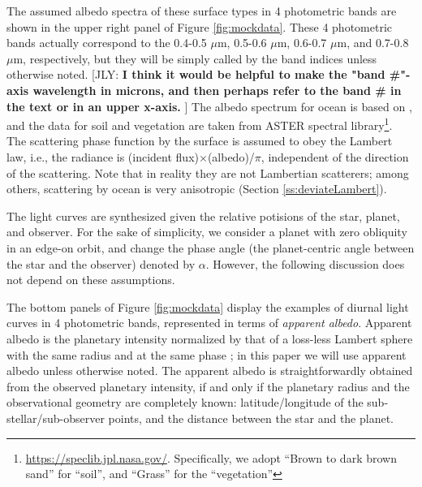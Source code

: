 \documentclass[iop,numberedappendix,apj,]{emulateapj}
\def\memoYF#1{\color{red}[YF: {\bf #1}]\color{black}}
\def\memoJLY#1{\color{green}[JLY: {\bf #1}]\color{black}}
\begin{document}
The assumed albedo spectra of these surface types in 4 photometric bands are shown in the upper right panel of Figure \ref{fig:mockdata}. 
These 4 photometric bands actually correspond to the 0.4-0.5 $\mu $m, 0.5-0.6 $\mu $m, 0.6-0.7 $\mu $m, and 0.7-0.8 $\mu $m, respectively, but they will be simply called by the band indices unless otherwise noted. \memoJLY{I think it would be helpful to make the "band \#"-axis wavelength in microns, and then perhaps refer to the band \# in the text or in an upper x-axis. }
The albedo spectrum for ocean is based on \citet{Mclinden1997}, 
and the data for soil and vegetation are taken from ASTER spectral library\footnote{\url{https://speclib.jpl.nasa.gov/}. 
Specifically, we adopt  ``Brown to dark brown sand'' for ``soil'', and ``Grass'' for the ``vegetation''}. 
The scattering phase function by the surface is assumed to obey the Lambert law, i.e., the radiance is (incident flux)$\times $(albedo)/$\pi$, independent of the direction of the scattering. 
Note that in reality they are not Lambertian scatterers; among others,  scattering by ocean is very anisotropic (Section \ref{ss:deviateLambert}).  


The light curves are synthesized given the relative potisions of the star, planet, and observer.  
For the sake of simplicity, we consider a planet with zero obliquity in an edge-on orbit, and change the phase angle (the planet-centric angle between the star and the observer) denoted by $\alpha $. 
However, the following discussion does not depend on these assumptions. 

The bottom panels of Figure \ref{fig:mockdata} display the examples of diurnal light curves in 4 photometric bands, represented in terms of {\it apparent albedo}. 
Apparent albedo is the planetary intensity normalized by that of a loss-less Lambert sphere with the same radius and at the same phase \citep{Qiu2003, Seager2010}; in this paper we will use apparent albedo unless otherwise noted. 
The apparent albedo is straightforwardly obtained from the observed planetary intensity, if and only if the planetary radius and the observational geometry are completely known: latitude/longitude of the sub-stellar/sub-observer points, and the distance between the star and the planet. 
\end{document}
